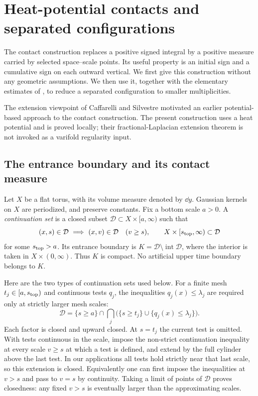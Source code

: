 \section{Heat-potential contacts and separated configurations}
\label{sec:contact}

The contact construction replaces a positive signed integral by a positive
measure carried by selected space--scale points.  Its useful property is
an initial sign and a cumulative sign on each outward vertical.  We first
give this construction without any geometric assumptions.  We then use
it, together with the elementary estimates of , to
reduce a separated configuration to smaller multiplicities.

The extension viewpoint of Caffarelli and Silvestre
\cite[Sections~1--2]{CS2007} motivated an earlier potential-based approach
to the contact construction.  The present construction uses a heat
potential and is proved locally; their fractional-Laplacian extension
theorem is not invoked as a varifold regularity input.

\subsection{The entrance boundary and its contact measure}

Let $X$ be a flat torus, with its volume measure denoted by $\dd y$.
Gaussian kernels on $X$ are periodized, and preserve constants.  Fix a
bottom scale $a>0$.  A \emph{continuation set} is a closed subset
$\mathcal D\subset X\times[a,\infty)$ such that
\[
 (x,s)\in\mathcal D\ \Longrightarrow\ (x,v)\in\mathcal D
 \quad(v\ge s),\qquad
 X\times[s_{\rm top},\infty)\subset\mathcal D
\]
for some $s_{\rm top}>a$.  Its entrance boundary is
$K=\mathcal D\setminus\operatorname{int}\mathcal D$, where the interior is
taken in $X\times(0,\infty)$.  Thus $K$ is compact.  No artificial upper
time boundary belongs to $K$.

Here are the two types of continuation sets used below.  For a finite
mesh $t_j\in[a,s_{\rm top})$ and continuous tests $q_j$, the inequalities
$q_j(x)\le\lambda_j$ are required only at strictly larger mesh scales:
\begin{equation}\label{ct:mesh-domain}
 \mathcal D=\{s\ge a\}\cap
 \bigcap_j\bigl(\{s\ge t_j\}\cup\{q_j(x)\le\lambda_j\}\bigr).
\end{equation}
Each factor is closed and upward closed.  At $s=t_j$ the current test is
omitted.  With tests continuous in the scale, impose the non-strict
continuation inequality at every scale $v\ge s$ at which a test is
defined, and extend by the full cylinder above the last test.  In our
applications all tests hold strictly near that last scale, so this
extension is closed.  Equivalently one can first impose the inequalities
at $v>s$ and pass to $v=s$ by continuity.  Taking a limit of points of
$\mathcal D$ proves closedness: any fixed $v>s$ is eventually larger
than the approximating scales.

